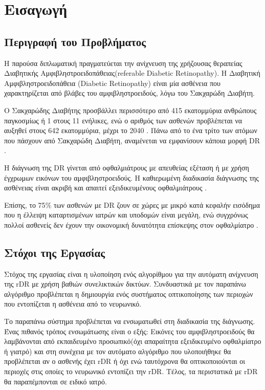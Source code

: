 \newpage
\cleardoublepage

\chapter{Εισαγωγή}
\label{chap:1}
\thispagestyle{plain}


\section{Περιγραφή του Προβλήματος }
\label{sec:1.1}
Η παρούσα διπλωματική πραγματεύεται την ανίχνευση της χρήζουσας θεραπείας Διαβητικής Αμφιβληστροειδοπάθειας(referable Diabetic Retinopathy). Η Διαβητική Αμφιβληστροειδοπάθεια (Diabetic Retinopathy) είναι μία ασθένεια που χαρακτηρίζεται από βλάβες του αμφιβληστροειδούς, λόγω του Σακχαρώδη Διαβήτη.

Ο Σακχαρώδης Διαβήτης προσβάλλει  περισσότερο από 415 εκατομμύρια ανθρώπους παγκοσμίως ή 1 στους 11 ενήλικες, ενώ ο αριθμός των ασθενών προβλέπεται να αυξηθεί στους 642 εκατομμύρια, μέχρι το 2040 \cite{Gargeya}\cite{Wang}. Πάνω από το ένα τρίτο των ατόμων που πάσχουν από Σακχαρώδη Διαβήτη, αναμένεται να εμφανίσουν κάποια μορφή DR \cite{Congdon}.

Η διάγνωση της DR γίνεται από οφθαλμιάτρους  με απευθείας εξέταση ή με χρήση έγχρωμων εικόνων του αμφιβληστροειδούς. Η καθιερωμένη διαδικασία διάγνωσης της ασθένειας είναι ακριβή και απαιτεί εξειδικευμένους οφθαλμιάτρους \cite{Nayak}.

Επίσης, το 75$\%$ των ασθενών με DR ζουν σε χώρες με μικρό κατά κεφαλήν εισόδημα που η έλλειψη καταρτισμένων ιατρών και υποδομών είναι μεγάλη, ενώ συγχρόνως πολλοί ασθενείς δεν έχουν την οικονομική δυνατότητα επίσκεψης στον οφθαλμίατρο \cite{Guariguata}\cite{Wang}.




\section{Στόχοι της Εργασίας}
\label{sec:1.2}
Στόχος της εργασίας είναι η υλοποίηση ενός αλγορίθμου για την αυτόματη ανίχνευση της rDR με χρήση βαθιών συνελικτικών δικτύων. Συνδυαστικά με τον παραπάνω αλγόριθμο προβλέπεται η δημιουργία ενός συστήματος οπτικοποίησης των περιοχών που εντοπίζεται η ασθένεια από το νευρωνικό.


Το παραπάνω σύστημα προβλέπεται να ενσωματωθεί στη διαδικασία της διάγνωσης. Ένας πιθανός τρόπος ενσωμάτωσης είναι ο εξής: Εικόνες του αμφιβληστροειδούς θα λαμβάνονται από εκπαιδευμένο προσωπικό(όχι απαραίτητα εξειδικευμένο οφθαλμίατρο ή γιατρό) και στη συνέχεια με τον αυτόματο αλγόριθμο που υλοποιήθηκε θα προβλέπεται αν ο ασθενής έχει rDR ή όχι ενώ ταυτόχρονα θα οπτικοποιούνται οι περιοχές στις οποίες το νευρωνικό εντοπίζει την rDR. Τέλος, τα περιστατικά με rDR θα παραπέμπονται σε ειδικό ιατρό.

